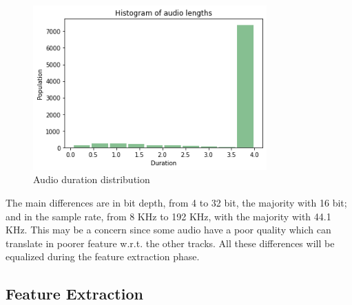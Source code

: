\documentclass{article}
\begin{document}
\begin{figure}[H]
	\centering
	\includegraphics[width=0.8\textwidth]{./images/mono/duration.png}	
	\caption{Audio duration distribution}
	\label{fig:mono_duration}
\end{figure}

The main differences are in bit depth, from 4 to 32 bit, the majority with 16 bit; and in the sample rate, from 8 KHz to 192 KHz, with the majority with 44.1 KHz. This may be a concern since some audio have a poor quality which can translate in poorer feature w.r.t. the other tracks. All these differences will be equalized during the feature extraction phase.

\subsection{Feature Extraction}
\label{subsec:mono_feature}
\end{document}
